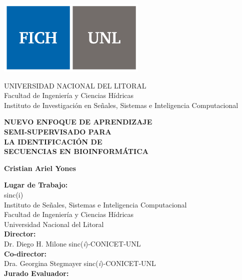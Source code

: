 \thispagestyle{empty}

\begin {center}

\includegraphics[scale=.5]{fig/logo_unl.png}

{\large UNIVERSIDAD NACIONAL DEL LITORAL}\\
{Facultad de Ingeniería y Ciencias Hídricas\\Instituto de Investigación en Señales, Sistemas e Inteligencia Computacional}

\vspace{3cm}
\textbf{\Large NUEVO ENFOQUE DE APRENDIZAJE}\\[0.1 cm]
\textbf{\Large SEMI-SUPERVISADO PARA}\\[0.1 cm]
\textbf{\Large LA IDENTIFICACIÓN DE}\\[0.1 cm]
\textbf{\Large SECUENCIAS EN BIOINFORMÁTICA}\\[0.1 cm]
\vspace{1cm}

\textbf{\large Cristian Ariel Yones}\\

\vspace{1cm}

\end{center}

{\large \noindent \textbf{Lugar de Trabajo:}\\
\vspace{1em}sinc(i)\\
Instituto de Señales, Sistemas e Inteligencia Computacional\\
Facultad de Ingeniería y Ciencias Hídricas\\
Universidad Nacional del Litoral\\[0.5cm]

\noindent\textbf{Director:}\\
Dr. Diego H. Milone\hspace{13.2em} sinc(\textit{i})-CONICET-UNL\\[0.4cm]
\noindent\textbf{Co-director:}\\
Dra. Georgina Stegmayer\hspace{11em} sinc(\textit{i})-CONICET-UNL\\[0.4cm]

\noindent\textbf{Jurado Evaluador:}\\

}

